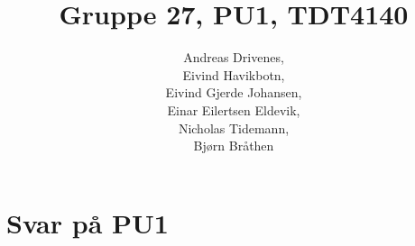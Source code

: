 \documentclass[english, a4paper]{article}
\title{Gruppe 27, PU1, TDT4140}
\author{	Andreas Drivenes,\\
		Eivind Havikbotn,\\
		Eivind Gjerde Johansen,\\
		Einar Eilertsen Eldevik,\\
		Nicholas Tidemann,\\
		Bjørn Bråthen\\
}
\begin{document}

\maketitle

\section{Svar på PU1}




\end{document}
